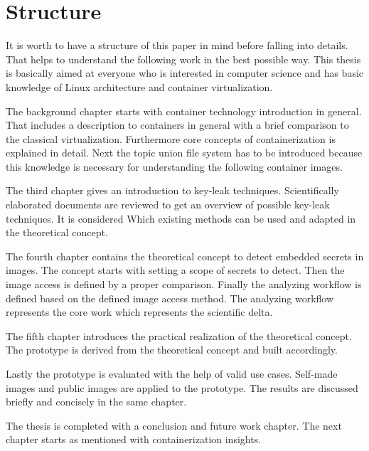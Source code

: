 %
%
\section{Structure}
\label{sec:intro:structure}
It is worth to have a structure of this paper in mind before falling into details. 
That helps to understand the following work in the best possible way. 
This thesis is basically aimed at everyone who is interested in computer science and has basic knowledge of Linux architecture and container virtualization.

The background chapter starts with container technology introduction in general. 
That includes a description to containers in general with a brief comparison to the classical virtualization. 
Furthermore core concepts of containerization is explained in detail.
Next the topic union file system has to be introduced because this knowledge is necessary for understanding the following container images.

The third chapter gives an introduction to key-leak techniques.
Scientifically elaborated documents are reviewed to get an overview of possible key-leak techniques.
It is considered Which existing methods can be used and adapted in the theoretical concept.

The fourth chapter contains the theoretical concept to detect embedded secrets in images. 
The concept starts with setting a scope of secrets to detect. Then the image access is defined by a proper comparison.
Finally the analyzing workflow is defined based on the defined image access method.
The analyzing workflow represents the core work which represents the scientific delta.

The fifth chapter introduces the practical realization of the theoretical concept. 
The prototype is derived from the theoretical concept and built accordingly.

Lastly the prototype is evaluated with the help of valid use cases. Self-made images and public images are applied to the prototype. 
The results are discussed briefly and concisely in the same chapter.

The thesis is completed with a conclusion and future work chapter.	
The next chapter starts as mentioned with containerization insights.
